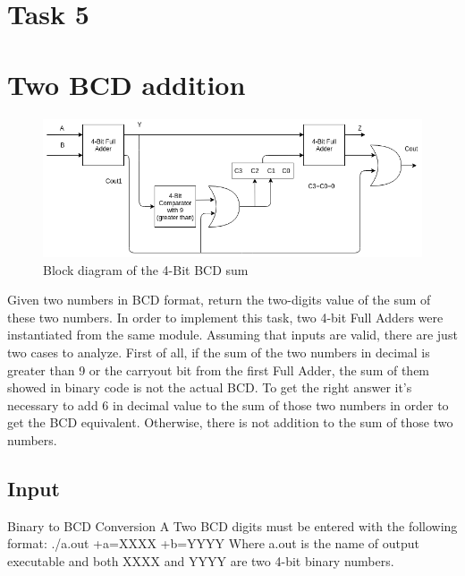 

\section*{Task 5}




\section{Two BCD addition}

\begin{figure}[H]
  \begin{centering}
  \includegraphics[scale=0.5]{data/ej5.png}
  \par\end{centering}
  \caption{Block diagram of the 4-Bit BCD sum}
\end{figure}
Given two numbers in BCD format, return the two-digits value of the sum of these two numbers.
In order to implement this task, two 4-bit Full Adders were instantiated from the same module.
Assuming that inputs are valid, there are just two cases to analyze. 
First of all, if the sum of the two numbers in decimal is greater than 9 or the carryout bit from the first Full Adder, the sum of them showed in binary code is not the actual BCD.   
To get the right answer it's necessary to add 6 in decimal value to the sum of those two numbers in order to get the BCD equivalent. Otherwise, there is not addition to the sum of those two numbers.



\subsection{Input}Binary to BCD Conversion A
Two BCD digits must be entered with the following format:
./a.out +a=XXXX +b=YYYY
Where a.out is the name of output executable and both XXXX and YYYY are two 4-bit binary numbers.

